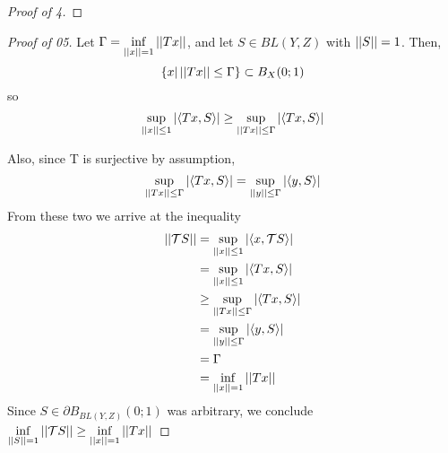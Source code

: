 \begin{prop}[\AdjointOperator]
\begin{proof}[Proof of 4]
    \end{proof}
    \begin{proof}[Proof of 05]
        Let $\Gamma=\inf\limits_{\left|\left| x \right|\right|=1} \left|\left| Tx \right|\right|$, 
        and let $S \in BL(Y,Z)$ with $\left|\left| S \right|\right| = 1$. 
        Then, 
        \begin{equation*}
            \{x | \left|\left| Tx \right|\right| \leq \Gamma\} \subset B_X(0;1)
        \end{equation*}
        so 
        \begin{equation*}
            \sup\limits_{\left|\left| x \right|\right|\leq 1} \left| \left\langle Tx, S \right\rangle \right| \geq \sup\limits_{\left|\left| Tx \right|\right| \leq \Gamma}\left| \left\langle Tx, S \right\rangle \right|
        \end{equation*}

        Also, since T is surjective by assumption, 
        \begin{equation*}
            \sup\limits_{\left|\left| Tx \right|\right| \leq \Gamma} \left| \left\langle Tx, S \right\rangle \right| = \sup\limits_{\left|\left| y \right|\right| \leq \Gamma} \left| \left\langle y, S \right\rangle \right|
        \end{equation*}
        From these two we arrive at the inequality
        \begin{align*}
            \left|\left| \mathcal{T} S \right|\right| & = \sup\limits_{\left|\left| x \right|\right|  \leq 1} \left| \left\langle x, \mathcal{T} S \right\rangle \right|\\
            & = \sup\limits_{\left|\left| x \right|\right| \leq 1} \left| \left\langle Tx, S \right\rangle \right|\\
            & \geq \sup\limits_{\left|\left| Tx \right|\right| \leq \Gamma} \left| \left\langle Tx, S \right\rangle \right|\\
            & = \sup\limits_{\left|\left| y \right|\right| \leq \Gamma} \left| \left\langle y, S \right\rangle \right|\\
            & = \Gamma\\
            & = \inf\limits_{\left|\left| x \right|\right| = 1} \left|\left| Tx \right|\right|
        \end{align*}
        Since $S \in \partial B_{BL(Y,Z)}(0;1)$ was arbitrary, we conclude
        $\inf\limits_{\left|\left| S \right|\right| = 1} \left|\left| \mathcal{T} S \right|\right| \geq \inf\limits_{\left|\left| x \right|\right| = 1} \left|\left| Tx \right|\right|$
    \end{proof}
\end{prop}
